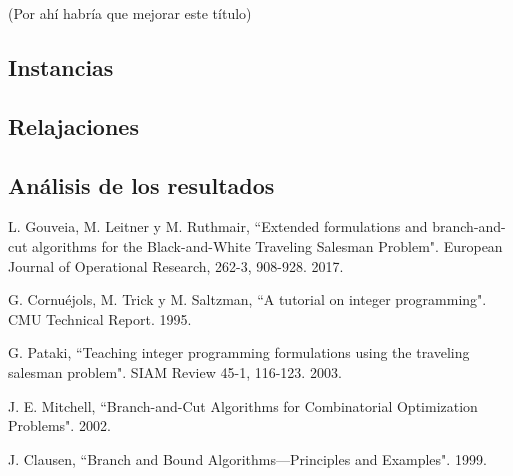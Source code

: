 \documentclass[10pt, a4paper]{article}
\theoremstyle{definition}
\begin{document}
(Por ahí habría que mejorar este título)

\subsection{Instancias}

\subsection{Relajaciones}

\subsection{Análisis de los resultados}

\pagebreak

\begin{thebibliography}{9}

L. Gouveia, M. Leitner y M. Ruthmair, “Extended formulations and branch-and-cut algorithms for the Black-and-White Traveling Salesman Problem". European Journal of Operational Research, 262-3, 908-928. 2017.

G. Cornuéjols, M. Trick y M. Saltzman, “A tutorial on integer programming". CMU Technical Report. 1995.

G. Pataki, “Teaching integer programming formulations using the traveling salesman problem". SIAM Review 45-1, 116-123. 2003.

J. E. Mitchell, “Branch-and-Cut Algorithms for Combinatorial Optimization Problems". 2002.

J. Clausen, “Branch and Bound Algorithms—Principles and Examples". 1999.

\end{thebibliography}
\end{document}

